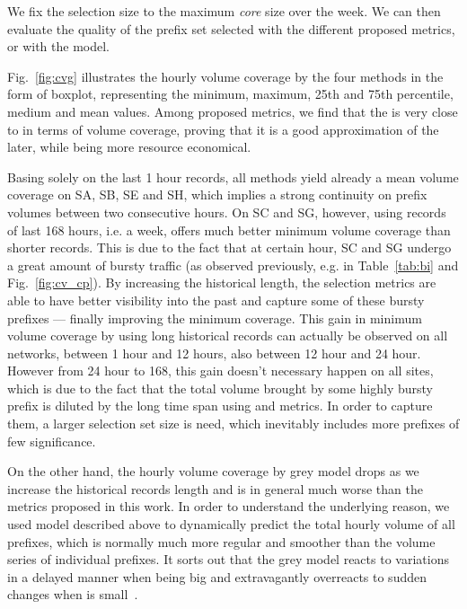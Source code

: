 \documentclass[10pt, conference,letterpaper]{IEEEtran}
\begin{document}
We fix the selection size to the maximum \textit{core} size over the week. 
We can then evaluate the quality of the prefix set selected with the different proposed metrics, or with the  model. 

Fig.~\ref{fig:cvg} illustrates the hourly volume coverage by the four methods in the form of boxplot, representing the minimum, maximum, 25th and 75th percentile, medium and mean values. 
Among proposed metrics, we find that the  is very close to  in terms of volume coverage, proving that it is a good approximation of the later, while being more resource economical.

Basing solely on the last 1 hour records, all methods yield already a mean volume coverage  on SA, SB, SE and SH, which implies a strong continuity on prefix volumes between two consecutive hours. 
On SC and SG, however, using records of last 168 hours, i.e. a week, offers much better minimum volume coverage than shorter records. This is due to the fact that at certain hour, SC and SG undergo a great amount of bursty traffic (as observed previously, e.g. in Table~\ref{tab:bi} and Fig.~\ref{fig:cv_cp}). By increasing the historical length, the selection metrics are able to have better visibility into the past and capture some of these bursty prefixes ---  finally improving the minimum coverage.
This gain in minimum volume coverage by using long historical records can actually be observed on all networks, between 1 hour and 12 hours, also between 12 hour and 24 hour. 
However from 24 hour to 168, this gain doesn't necessary happen on all sites, which is due to the fact that the total volume brought by some highly bursty prefix is diluted by the long time span using  and  metrics. In order to capture them, a larger selection set size is need, which inevitably includes more prefixes of few significance.





On the other hand, the hourly volume coverage by grey model drops as we increase the historical records length and is in general much worse than the metrics proposed in this work. 
In order to understand the underlying reason, we used  model described above to dynamically predict the total hourly volume of all prefixes, which is normally much more regular and smoother than the volume series of individual prefixes. It sorts out that the grey model reacts to variations in a delayed manner when  being big and extravagantly overreacts to sudden changes when  is small~\cite{RR}. 
\end{document}
